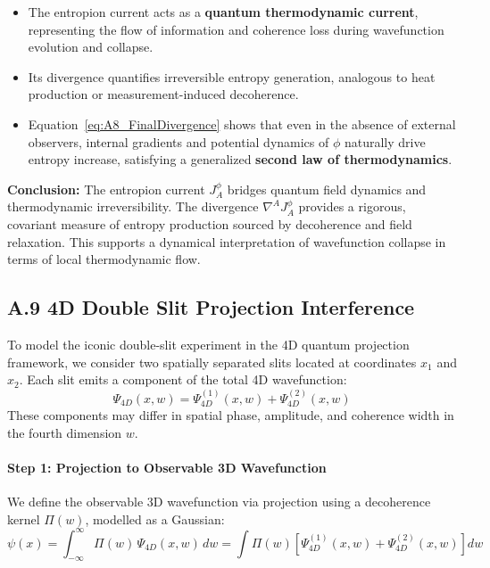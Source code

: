 \documentclass[12pt]{article}
\begin{document}
\begin{itemize}
  \item The entropion current acts as a \textbf{quantum thermodynamic current}, representing the flow of information and coherence loss during wavefunction evolution and collapse.
  \item Its divergence quantifies irreversible entropy generation, analogous to heat production or measurement-induced decoherence.
  \item Equation~\eqref{eq:A8_FinalDivergence} shows that even in the absence of external observers, internal gradients and potential dynamics of \(\phi\) naturally drive entropy increase, satisfying a generalized \textbf{second law of thermodynamics}.
\end{itemize}

\textbf{Conclusion:}  
The entropion current \(J^\phi_A\) bridges quantum field dynamics and thermodynamic irreversibility. The divergence \(\nabla^A J^\phi_A\) provides a rigorous, covariant measure of entropy production sourced by decoherence and field relaxation. This supports a dynamical interpretation of wavefunction collapse in terms of local thermodynamic flow.



\subsection*{A.9 \quad 4D Double Slit Projection Interference}
\label{eq:A9}

To model the iconic double-slit experiment in the 4D quantum projection framework, we consider two spatially separated slits located at coordinates \(x_1\) and \(x_2\). Each slit emits a component of the total 4D wavefunction:
\begin{equation}
\Psi_{4D}(x, w) = \Psi_{4D}^{(1)}(x, w) + \Psi_{4D}^{(2)}(x, w)
\label{eq:A9_TotalPsi}
\end{equation}
These components may differ in spatial phase, amplitude, and coherence width in the fourth dimension \(w\).

\paragraph{Step 1: Projection to Observable 3D Wavefunction}

We define the observable 3D wavefunction via projection using a decoherence kernel \(\Pi(w)\), modelled as a Gaussian:
\begin{equation}
\psi(x) = \int_{-\infty}^{\infty} \Pi(w)\, \Psi_{4D}(x, w)\, dw
= \int \Pi(w)\left[ \Psi_{4D}^{(1)}(x, w) + \Psi_{4D}^{(2)}(x, w) \right] dw
\label{eq:A9_Projection}
\end{equation}
\end{document}
